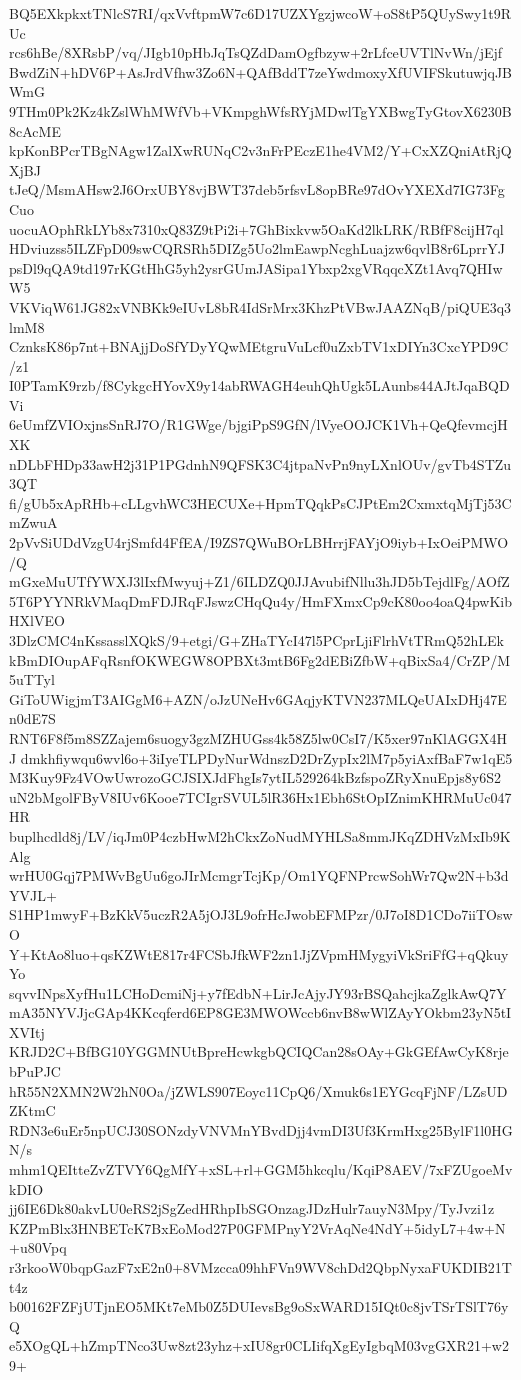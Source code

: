 BQ5EXkpkxtTNlcS7RI/qxVvftpmW7c6D17UZXYgzjwcoW+oS8tP5QUySwy1t9RUc
rcs6hBe/8XRsbP/vq/JIgb10pHbJqTsQZdDamOgfbzyw+2rLfceUVTlNvWn/jEjf
BwdZiN+hDV6P+AsJrdVfhw3Zo6N+QAfBddT7zeYwdmoxyXfUVIFSkutuwjqJBWmG
9THm0Pk2Kz4kZslWhMWfVb+VKmpghWfsRYjMDwlTgYXBwgTyGtovX6230B8cAcME
kpKonBPcrTBgNAgw1ZalXwRUNqC2v3nFrPEczE1he4VM2/Y+CxXZQniAtRjQXjBJ
tJeQ/MsmAHsw2J6OrxUBY8vjBWT37deb5rfsvL8opBRe97dOvYXEXd7IG73FgCuo
uocuAOphRkLYb8x7310xQ83Z9tPi2i+7GhBixkvw5OaKd2lkLRK/RBfF8cijH7ql
HDviuzss5ILZFpD09swCQRSRh5DIZg5Uo2lmEawpNcghLuajzw6qvlB8r6LprrYJ
psDl9qQA9td197rKGtHhG5yh2ysrGUmJASipa1Ybxp2xgVRqqcXZt1Avq7QHIwW5
VKViqW61JG82xVNBKk9eIUvL8bR4IdSrMrx3KhzPtVBwJAAZNqB/piQUE3q3lmM8
CznksK86p7nt+BNAjjDoSfYDyYQwMEtgruVuLcf0uZxbTV1xDIYn3CxcYPD9C/z1
I0PTamK9rzb/f8CykgcHYovX9y14abRWAGH4euhQhUgk5LAunbs44AJtJqaBQDVi
6eUmfZVIOxjnsSnRJ7O/R1GWge/bjgiPpS9GfN/lVyeOOJCK1Vh+QeQfevmcjHXK
nDLbFHDp33awH2j31P1PGdnhN9QFSK3C4jtpaNvPn9nyLXnlOUv/gvTb4STZu3QT
fi/gUb5xApRHb+cLLgvhWC3HECUXe+HpmTQqkPsCJPtEm2CxmxtqMjTj53CmZwuA
2pVvSiUDdVzgU4rjSmfd4FfEA/I9ZS7QWuBOrLBHrrjFAYjO9iyb+IxOeiPMWO/Q
mGxeMuUTfYWXJ3lIxfMwyuj+Z1/6ILDZQ0JJAvubifNllu3hJD5bTejdlFg/AOfZ
5T6PYYNRkVMaqDmFDJRqFJswzCHqQu4y/HmFXmxCp9cK80oo4oaQ4pwKibHXlVEO
3DlzCMC4nKssasslXQkS/9+etgi/G+ZHaTYcI47l5PCprLjiFlrhVtTRmQ52hLEk
kBmDIOupAFqRsnfOKWEGW8OPBXt3mtB6Fg2dEBiZfbW+qBixSa4/CrZP/M5uTTyl
GiToUWigjmT3AIGgM6+AZN/oJzUNeHv6GAqjyKTVN237MLQeUAIxDHj47En0dE7S
RNT6F8f5m8SZZajem6suogy3gzMZHUGss4k58Z5lw0CsI7/K5xer97nKlAGGX4HJ
dmkhfiywqu6wvl6o+3iIyeTLPDyNurWdnszD2DrZypIx2lM7p5yiAxfBaF7w1qE5
M3Kuy9Fz4VOwUwrozoGCJSIXJdFhgIs7ytIL529264kBzfspoZRyXnuEpjs8y6S2
uN2bMgolFByV8IUv6Kooe7TCIgrSVUL5lR36Hx1Ebh6StOpIZnimKHRMuUc047HR
buplhcdld8j/LV/iqJm0P4czbHwM2hCkxZoNudMYHLSa8mmJKqZDHVzMxIb9KAlg
wrHU0Gqj7PMWvBgUu6goJIrMcmgrTcjKp/Om1YQFNPrcwSohWr7Qw2N+b3dYVJL+
S1HP1mwyF+BzKkV5uczR2A5jOJ3L9ofrHcJwobEFMPzr/0J7oI8D1CDo7iiTOswO
Y+KtAo8luo+qsKZWtE817r4FCSbJfkWF2zn1JjZVpmHMygyiVkSriFfG+qQkuyYo
sqvvINpsXyfHu1LCHoDcmiNj+y7fEdbN+LirJcAjyJY93rBSQahcjkaZglkAwQ7Y
mA35NYVJjcGAp4KKcqferd6EP8GE3MWOWccb6nvB8wWlZAyYOkbm23yN5tIXVItj
KRJD2C+BfBG10YGGMNUtBpreHcwkgbQCIQCan28sOAy+GkGEfAwCyK8rjebPuPJC
hR55N2XMN2W2hN0Oa/jZWLS907Eoyc11CpQ6/Xmuk6s1EYGcqFjNF/LZsUDZKtmC
RDN3e6uEr5npUCJ30SONzdyVNVMnYBvdDjj4vmDI3Uf3KrmHxg25BylF1l0HGN/s
mhm1QEItteZvZTVY6QgMfY+xSL+rl+GGM5hkcqlu/KqiP8AEV/7xFZUgoeMvkDIO
jj6IE6Dk80akvLU0eRS2jSgZedHRhpIbSGOnzagJDzHulr7auyN3Mpy/TyJvzi1z
KZPmBlx3HNBETcK7BxEoMod27P0GFMPnyY2VrAqNe4NdY+5idyL7+4w+N+u80Vpq
r3rkooW0bqpGazF7xE2n0+8VMzcca09hhFVn9WV8chDd2QbpNyxaFUKDIB21Tt4z
b00162FZFjUTjnEO5MKt7eMb0Z5DUIevsBg9oSxWARD15IQt0c8jvTSrTSlT76yQ
e5XOgQL+hZmpTNco3Uw8zt23yhz+xIU8gr0CLIifqXgEyIgbqM03vgGXR21+w29+
